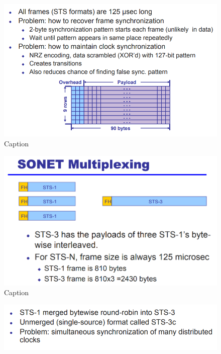 \documentclass[11pt, a4paper]{article}
\begin{document}
\begin{figure}[H]
    \centering
    \includegraphics[width = \textwidth]{Pictures/SONET1.png}
    \caption{Caption}
    \label{fig:my_label}
\end{figure}
\begin{figure}[H]
    \centering
    \includegraphics[width = \textwidth]{Pictures/SONET2.png}
    \caption{Caption}
    \label{fig:my_label}
\end{figure}
\begin{figure}[H]
    \centering
    \includegraphics[width = \textwidth]{Pictures/SONET3.png}
    \label{fig:my_label}
\end{figure}
\end{document}
